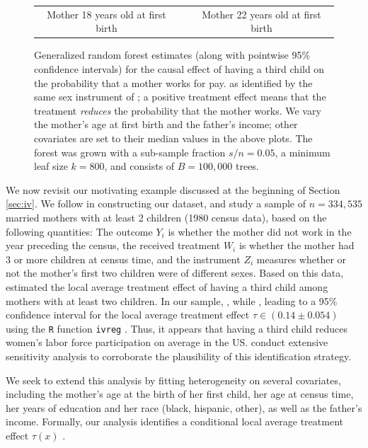 \documentclass[aos]{imsart}
\theoremstyle{plain}
\theoremstyle{definition}
\theoremstyle{remark}
\begin{document}
\begin{CJK}{UTF8}{gbsn}
{\begin{figure}
\begin{tabular}{ccc}
Mother 18 years old at first birth & & Mother 22 years old at first birth
\end{tabular}
\caption{Generalized random forest estimates (along with pointwise 95\% confidence intervals)
for the causal effect of having a third child on the probability
that a mother works for pay.
as identified by the same sex instrument of \citet{angrist1998children};
a positive treatment effect means that the treatment \emph{reduces} the probability that the mother works.
We vary the mother's age at first birth
and the father's income; other covariates are set to their median values in the above plots.
The forest was grown with a sub-sample fraction $s/n = 0.05$, a minimum leaf size $k = 800$, and
consists of $B = 100,000$ trees.}
\label{fig:familysize}
\vspace{-1.5\baselineskip}
\end{figure}

We now revisit our motivating example discussed at the beginning of Section \ref{sec:iv}.
We follow \citet{angrist1998children} in constructing our dataset, and
study a sample of $n = 334,535$ married mothers with at least 2 children (1980 census data),
based on the following quantities: The outcome $Y_i$ is whether the mother did not work in the
year preceding the census, the received treatment $W_i$ is whether the mother had 3 or more
children at census time, and the instrument $Z_i$ measures whether or not
the mother's first two children were of different sexes.
Based on this data, \citet{angrist1998children} estimated the local average treatment effect
of having a third child among mothers with at least two children.
In our sample, , while
, leading to a 95\% confidence interval for the
local average treatment effect $\tau \in (0.14 \pm 0.054)$ using the \texttt{R} function
\texttt{ivreg} \citep{kleiber2008applied}. Thus, it appears that having a third child reduces
women's labor force participation on average in the US.
\citet{angrist1998children} conduct extensive sensitivity analysis to corroborate the
plausibility of this identification strategy.

We seek to extend this analysis by fitting heterogeneity
on several covariates, including the mother's age at the birth of her first child, her age at census time,
her years of education and her race (black, hispanic, other), as well as the father's income. Formally, our analysis identifies
a conditional local average treatment effect $\tau(x)$ \citep{abadie2003semiparametric,imbens1994identification}.

}
\end{CJK}
\end{document}

